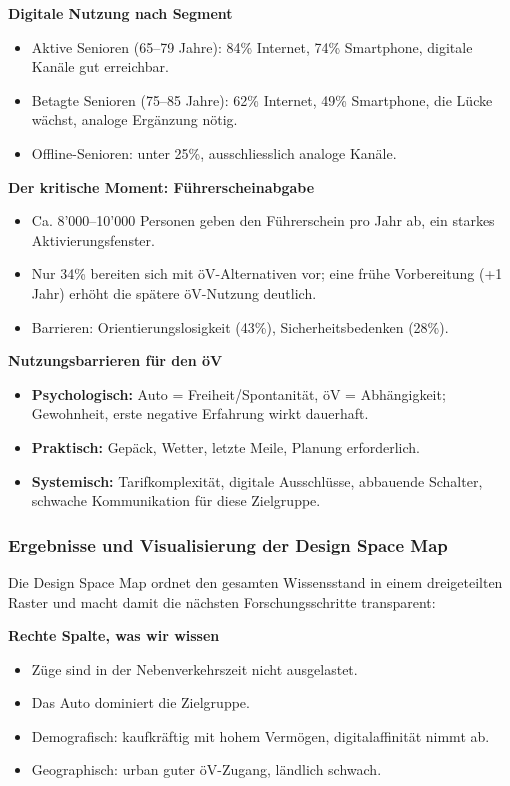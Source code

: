 \columnbreak
\textbf{Digitale Nutzung nach Segment} \parencite{sotomo2021}
\begin{itemize}
  \item Aktive Senioren (65--79 Jahre): 84\% Internet, 74\% Smartphone, digitale Kanäle gut erreichbar.
  \item Betagte Senioren (75--85 Jahre): 62\% Internet, 49\% Smartphone, die Lücke wächst, analoge Ergänzung nötig.
  \item Offline-Senioren: unter 25\%, ausschliesslich analoge Kanäle.
\end{itemize}

\textbf{Der kritische Moment: Führerscheinabgabe}
\begin{itemize}
  \item Ca. 8'000--10'000 Personen geben den Führerschein pro Jahr ab, ein starkes Aktivierungsfenster.
  \item Nur 34\% bereiten sich mit öV-Alternativen vor; eine frühe Vorbereitung (+1 Jahr) erhöht die spätere öV-Nutzung deutlich.
  \item Barrieren: Orientierungslosigkeit (43\%), Sicherheitsbedenken (28\%).
\end{itemize}

\textbf{Nutzungsbarrieren für den öV}
\begin{itemize}
  \item \textbf{Psychologisch:} Auto = Freiheit/Spontanität, öV = Abhängigkeit; Gewohnheit, erste negative Erfahrung wirkt dauerhaft.
  \item \textbf{Praktisch:} Gepäck, Wetter, letzte Meile, Planung erforderlich.
  \item \textbf{Systemisch:} Tarifkomplexität, digitale Ausschlüsse, abbauende Schalter, schwache Kommunikation für diese Zielgruppe.
\end{itemize}

\columnbreak
\columnbreak
\subsubsection{Ergebnisse und Visualisierung der Design Space Map}

Die Design Space Map ordnet den gesamten Wissensstand in einem dreigeteilten Raster und macht damit die nächsten Forschungsschritte transparent:

\textbf{Rechte Spalte, was wir wissen}
\begin{itemize}
  \item Züge sind in der Nebenverkehrszeit nicht ausgelastet.
  \item Das Auto dominiert die Zielgruppe.
  \item Demografisch: kaufkräftig mit hohem Vermögen, digitalaffinität nimmt ab.
  \item Geographisch: urban guter öV-Zugang, ländlich schwach.
\end{itemize}

